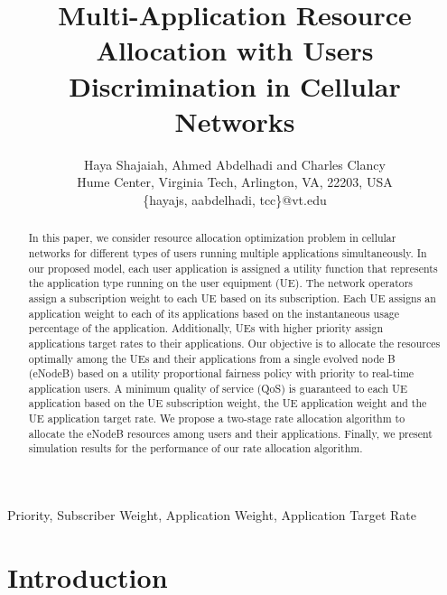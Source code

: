 \documentclass[journal]{IEEEtran} 				\IEEEoverridecommandlockouts 						\usepackage{amsmath,amssymb}
\begin{document}
\title{Multi-Application Resource Allocation with Users Discrimination in Cellular Networks}
\author{Haya Shajaiah, Ahmed Abdelhadi and Charles Clancy \\
Hume Center, Virginia Tech, Arlington, VA, 22203, USA\\
\{hayajs, aabdelhadi, tcc\}@vt.edu
}
\maketitle


\begin{abstract}
In this paper, we consider resource allocation optimization problem in cellular networks for different types of users running multiple applications simultaneously. In our proposed model, each user application is assigned a utility function that represents the application type running on the user equipment (UE). The network operators assign a subscription weight to each UE based on its subscription. Each UE assigns an application weight to each of its applications based on the instantaneous usage percentage of the application. Additionally, UEs with higher priority assign applications target rates to their applications. Our objective is to allocate the resources optimally among the UEs and their applications from a single evolved node B (eNodeB) based on a utility proportional fairness policy with priority to real-time application users. A minimum quality of service (QoS) is guaranteed to each UE application based on the UE subscription weight, the UE application weight and the UE application target rate.  We propose a two-stage rate allocation algorithm to allocate the eNodeB resources among users and their applications. Finally, we present simulation results for the performance of our rate allocation algorithm.
\end{abstract}

\begin{keywords}
Priority, Subscriber Weight, Application Weight, Application Target Rate
\end{keywords}

\providelength{\AxesLineWidth}       \setlength{\AxesLineWidth}{0.5pt}\providelength{\plotwidth}           \setlength{\plotwidth}{8cm}\providelength{\LineWidth}           \setlength{\LineWidth}{0.7pt}\providelength{\MarkerSize}          \setlength{\MarkerSize}{3pt}

\section{Introduction}\label{sec:intro}
\end{document}
